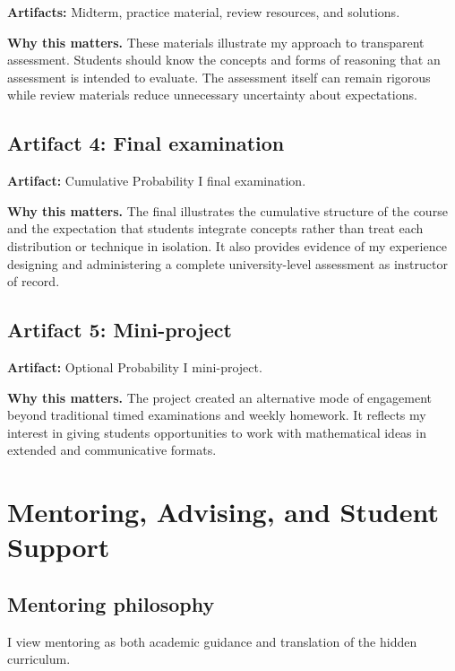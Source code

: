 \documentclass[11pt]{article}
\begin{document}
\textbf{Artifacts:}
Midterm,
practice material,
review resources,
and solutions.

\textbf{Why this matters.}
These materials illustrate my approach to transparent
assessment.
Students should know the concepts and forms of reasoning that
an assessment is intended to evaluate.
The assessment itself can remain rigorous while review
materials reduce unnecessary uncertainty about expectations.

\subsection{Artifact 4: Final examination}

\textbf{Artifact:}
Cumulative Probability I final examination.

\textbf{Why this matters.}
The final illustrates the cumulative structure of the course
and the expectation that students integrate concepts rather
than treat each distribution or technique in isolation.
It also provides evidence of my experience designing and
administering a complete university-level assessment as
instructor of record.

\subsection{Artifact 5: Mini-project}

\textbf{Artifact:}
Optional Probability I mini-project.

\textbf{Why this matters.}
The project created an alternative mode of engagement beyond
traditional timed examinations and weekly homework.
It reflects my interest in giving students opportunities to
work with mathematical ideas in extended and communicative
formats.


\section{Mentoring, Advising, and Student Support}

\subsection{Mentoring philosophy}

I view mentoring as both academic guidance and translation of
the hidden curriculum.
\end{document}
